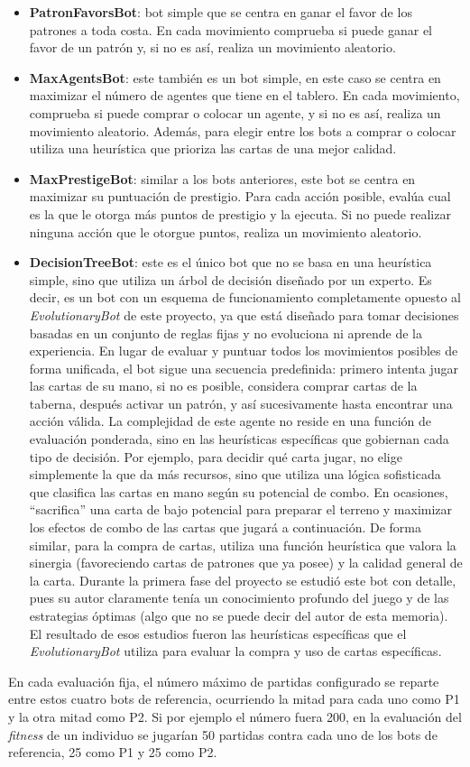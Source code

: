 \begin{itemize}
	\item \textbf{PatronFavorsBot}: bot simple que se centra en ganar el favor de los patrones a toda costa. En cada movimiento comprueba si puede ganar el favor de un patrón y, si no es así, realiza un movimiento aleatorio.
	\item \textbf{MaxAgentsBot}: este también es un bot simple, en este caso se centra en maximizar el número de agentes que tiene en el tablero. En cada movimiento, comprueba si puede comprar o colocar un agente, y si no es así, realiza un movimiento aleatorio. Además, para elegir entre los bots a comprar o colocar utiliza una heurística que prioriza las cartas de una mejor calidad.
	\item \textbf{MaxPrestigeBot}: similar a los bots anteriores, este bot se centra en maximizar su puntuación de prestigio. Para cada acción posible, evalúa cual es la que le otorga más puntos de prestigio y la ejecuta. Si no puede realizar ninguna acción que le otorgue puntos, realiza un movimiento aleatorio.
	\item \textbf{DecisionTreeBot}: este es el único bot que no se basa en una heurística simple, sino que utiliza un árbol de decisión diseñado por un experto. Es decir, es un bot con un esquema de funcionamiento completamente opuesto al \textit{EvolutionaryBot} de este proyecto, ya que está diseñado para tomar decisiones basadas en un conjunto de reglas fijas y no evoluciona ni aprende de la experiencia. En lugar de evaluar y puntuar todos los movimientos posibles de forma unificada, el bot sigue una secuencia predefinida: primero intenta jugar las cartas de su mano, si no es posible, considera comprar cartas de la taberna, después activar un patrón, y así sucesivamente hasta encontrar una acción válida. La complejidad de este agente no reside en una función de evaluación ponderada, sino en las heurísticas específicas que gobiernan cada tipo de decisión. Por ejemplo, para decidir qué carta jugar, no elige simplemente la que da más recursos, sino que utiliza una lógica sofisticada que clasifica las cartas en mano según su potencial de combo. En ocasiones, ``sacrifica'' una carta de bajo potencial para preparar el terreno y maximizar los efectos de combo de las cartas que jugará a continuación. De forma similar, para la compra de cartas, utiliza una función heurística que valora la sinergia (favoreciendo cartas de patrones que ya posee) y la calidad general de la carta. Durante la primera fase del proyecto se estudió este bot con detalle, pues su autor claramente tenía un conocimiento profundo del juego y de las estrategias óptimas (algo que no se puede decir del autor de esta memoria). El resultado de esos estudios fueron las heurísticas específicas que el \textit{EvolutionaryBot} utiliza para evaluar la compra y uso de cartas específicas.
\end{itemize}

En cada evaluación fija, el número máximo de partidas configurado se reparte entre estos cuatro bots de referencia, ocurriendo la mitad para cada uno como P1 y la otra mitad como P2. Si por ejemplo el número fuera 200, en la evaluación del \textit{fitness} de un individuo se jugarían 50 partidas contra cada uno de los bots de referencia, 25 como P1 y 25 como P2.